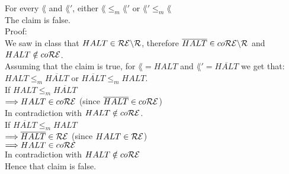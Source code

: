 For every $\lang$ and $\lang'$, either $\lang \leq_m \lang'$ or $\lang' \leq_m \lang$ \\
The claim is false. \\

Proof: \\
We saw in class that $HALT \in \mathcal{R}\mathcal{E} \backslash \mathcal{R}$, therefore $\overline{HALT} \in co\mathcal{R}\mathcal{E} \backslash \mathcal{R}$ and $HALT \notin co\mathcal{R}\mathcal{E}$. \\
Assuming that the claim is true, for $\lang=HALT$ and $\lang'=\overline{HALT}$ we get that: \\
$HALT \leq_m \overline{HALT}$ or $\overline{HALT} \leq_m HALT$. \\

If $HALT \leq_m \overline{HALT}$ \\
$\Longrightarrow HALT \in co\mathcal{R}\mathcal{E}$ (since $\overline{HALT} \in co\mathcal{R}\mathcal{E}$) \\
In contradiction with $HALT \notin co\mathcal{R}\mathcal{E}$. \\

If $\overline{HALT} \leq_m HALT$ \\
$\Longrightarrow \overline{HALT} \in \mathcal{R}\mathcal{E}$ (since $HALT \in \mathcal{R}\mathcal{E}$) \\
$\Longrightarrow HALT \in co\mathcal{R}\mathcal{E}$ \\
In contradiction with $HALT \notin co\mathcal{R}\mathcal{E}$ \\

Hence that claim is false. \\

